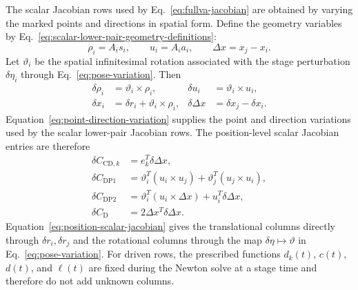 \documentclass[preprint,12pt]{elsarticle}
\begin{document}
The scalar Jacobian rows used by Eq.~\eqref{eq:fullva-jacobian} are obtained
by varying the marked points and directions in spatial form. Define the
geometry variables by Eq.~\eqref{eq:scalar-lower-pair-geometry-definitions}:
\begin{equation}
\label{eq:scalar-lower-pair-geometry-definitions}
  \rho_i=A_i s_i,\qquad u_i=A_i a_i,\qquad
  \Delta x=x_j-x_i .
\end{equation}
Let $\vartheta_i$ be the spatial infinitesimal rotation associated with the
stage perturbation $\delta\eta_i$ through Eq.~\eqref{eq:pose-variation}. Then
\begin{align}
  \delta \rho_i &= \vartheta_i\times \rho_i,&
  \delta u_i &= \vartheta_i\times u_i,\\
  \delta x_i &= \delta r_i+\vartheta_i\times\rho_i,&
  \delta\Delta x &= \delta x_j-\delta x_i .
  \label{eq:point-direction-variation}
\end{align}
Equation~\eqref{eq:point-direction-variation} supplies the point and
direction variations used by the scalar lower-pair Jacobian rows.
The position-level scalar Jacobian entries are therefore
\begin{align}
  \delta C_{\mathrm{CD},k}
    &= e_k^T\delta\Delta x,\\
  \delta C_{\mathrm{DP1}}
    &= \vartheta_i^T(u_i\times u_j)
       +\vartheta_j^T(u_j\times u_i),\\
  \delta C_{\mathrm{DP2}}
    &= \vartheta_i^T(u_i\times\Delta x)
       +u_i^T\delta\Delta x,\\
  \delta C_{\mathrm{D}}
    &= 2\Delta x^T\delta\Delta x .
  \label{eq:position-scalar-jacobian}
\end{align}
Equation~\eqref{eq:position-scalar-jacobian} gives the translational columns
directly through $\delta r_i,\delta r_j$ and the rotational columns through
the map $\delta\eta\mapsto\vartheta$ in Eq.~\eqref{eq:pose-variation}. For
driven rows, the prescribed functions $d_k(t)$, $c(t)$, $d(t)$, and
$\ell(t)$ are fixed during the Newton solve at a stage time and therefore do
not add unknown columns.
\end{document}
